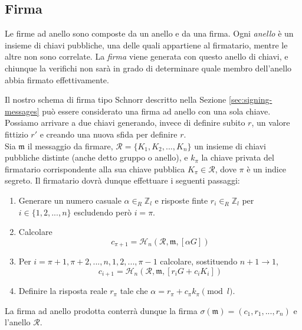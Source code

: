 \subsection*{Firma}

Le firme ad anello sono composte da un anello e da una firma. Ogni {\em anello} è un insieme di chiavi pubbliche, una delle quali appartiene al firmatario, mentre le altre non sono correlate. La {\em firma} viene generata con questo anello di chiavi, e chiunque la verifichi non sarà in grado di determinare quale membro dell’anello abbia firmato effettivamente.

Il nostro schema di firma tipo Schnorr descritto nella Sezione \ref{sec:signing-messages} può essere considerato una firma ad anello con una sola chiave. Possiamo arrivare a due chiavi generando, invece di definire subito $r$, un valore fittizio $r'$ e creando una nuova sfida per definire $r$.
\\

Sia \(\mathfrak{m}\) il messaggio da firmare, \(\mathcal{R} = \{K_1, K_2, ..., K_n\}\) un insieme di chiavi pubbliche distinte (anche detto gruppo o anello), e \(k_\pi\) la chiave privata del firmatario corrispondente alla sua chiave pubblica \(K_\pi \in \mathcal{R}\), dove $\pi$ è un indice segreto. Il firmatario dovrà dunque effettuare i seguenti passaggi:

\begin{enumerate}
	\item Generare un numero casuale \(\alpha \in_R \mathbb{Z}_l\) e risposte finte \(r_i \in_R \mathbb{Z}_l\) per \(i \in \{1, 2, ..., n\}\) escludendo però \(i = \pi\).

	\item Calcolare
	\[c_{\pi+1} = \mathcal{H}_n(\mathcal{R}, \mathfrak{m}, [\alpha G])\]

	\item Per \(i = \pi+1, \pi+2, ..., n, 1, 2, ..., \pi-1\) calcolare, sostituendo \(n + 1 \rightarrow 1\),\vspace{.175cm}
	\[  c_{i+1} = \mathcal{H}_n(\mathcal{R}, \mathfrak{m}, [r_i G + c_i K_i])\] 

	\item Definire la risposta reale \(r_\pi\) tale che \(\alpha = r_\pi + c_\pi k_\pi \pmod l\).
\end{enumerate}

La firma ad anello prodotta conterrà dunque la firma \(\sigma(\mathfrak{m}) = (c_1, r_1, ..., r_n)\) e l’anello \(\mathcal{R}\).


